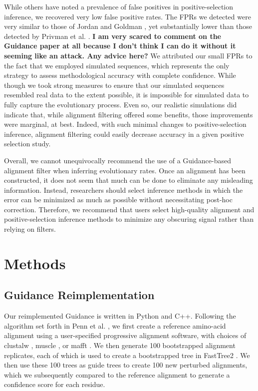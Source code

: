 \documentclass[10pt]{article}
\begin{document}
While others have noted a prevalence of false positives in positive-selection inference, we recovered very low false positive rates. The FPRs we detected were very similar to those of Jordan and Goldman \citet{Jordan2011}, yet substantially lower than those detected by Privman et al. \citet{Privman2012}. \textbf{I am very scared to comment on the Guidance paper at all because I don't think I can do it without it seeming like an attack. Any advice here?} We attributed our small FPRs to the fact that we employed simulated sequences, which represents the only strategy to assess methodological accuracy with complete confidence. While though we took strong measures to ensure that our simulated sequences resembled real data to the extent possible, it is impossible for simulated data to fully capture the evolutionary process. Even so, our realistic simulations did indicate that, while alignment filtering offered some benefits, those improvements were marginal, at best. Indeed, with such minimal changes to positive-selection inference, alignment filtering could easily decrease accuracy in a given positive selection study.  

Overall, we cannot unequivocally recommend the use of a Guidance-based alignment filter when inferring evolutionary rates. Once an alignment has been constructed, it does not seem that much can be done to eliminate any misleading information. Instead, researchers should select inference methods in which the error can be minimized as much as possible without necessitating post-hoc correction. Therefore, we recommend that users select high-quality alignment and positive-selection inference methods to minimize any obscuring signal rather than relying on filters.


\section*{Methods}

\subsection*{Guidance Reimplementation}
Our reimplemented Guidance is written in Python and C++. Following the algorithm set forth in Penn et al. \citep{Penn2010}, we first create a reference amino-acid alignment using a user-specified progressive alignment software, with choices of clustalw \citep{Thompson1994}, muscle \citep{Edgar2004}, or mafft \citep{Katoh2002, Katoh2005}. We then generate 100 bootstrapped alignment replicates, each of which is used to create a bootstrapped tree in FastTree2 \citep{Price2010}. We then use these 100 trees as guide trees to create 100 new perturbed alignments, which we subsequently compared to the reference alignment to generate a confidence score for each residue.
\end{document}
